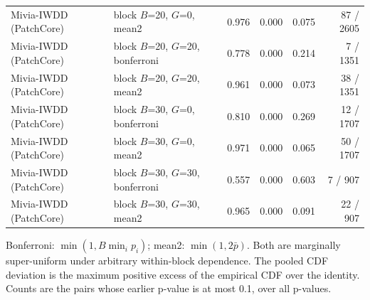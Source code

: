 \begin{table}[t]
{\begin{tabular}{llrrrr}
Mivia-IWDD (PatchCore) & block $B$=20, $G$=0, mean2 & 0.976 & 0.000 & 0.075 & 87 / 2605 \\
Mivia-IWDD (PatchCore) & block $B$=20, $G$=20, bonferroni & 0.778 & 0.000 & 0.214 & 7 / 1351 \\
Mivia-IWDD (PatchCore) & block $B$=20, $G$=20, mean2 & 0.961 & 0.000 & 0.073 & 38 / 1351 \\
Mivia-IWDD (PatchCore) & block $B$=30, $G$=0, bonferroni & 0.810 & 0.000 & 0.269 & 12 / 1707 \\
Mivia-IWDD (PatchCore) & block $B$=30, $G$=0, mean2 & 0.971 & 0.000 & 0.065 & 50 / 1707 \\
Mivia-IWDD (PatchCore) & block $B$=30, $G$=30, bonferroni & 0.557 & 0.000 & 0.603 & 7 / 907 \\
Mivia-IWDD (PatchCore) & block $B$=30, $G$=30, mean2 & 0.965 & 0.000 & 0.091 & 22 / 907 \\
\bottomrule
\end{tabular}}
\begin{minipage}{\linewidth}\vspace{2pt}\footnotesize Bonferroni: $\min(1,B\min_i p_i)$; mean2: $\min(1,2\bar p)$. Both are marginally super-uniform under arbitrary within-block dependence. The pooled CDF deviation is the maximum positive excess of the empirical CDF over the identity. Counts are the pairs whose earlier p-value is at most 0.1, over all p-values.\end{minipage}
\end{table}
